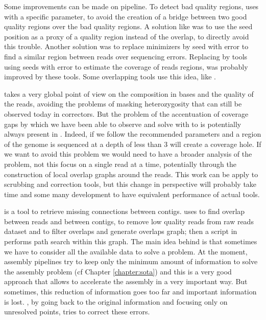 \documentclass[main.tex]{subfiles}
\begin{document}
Some improvements can be made on \yacrd pipeline. To detect bad quality regions, \yacrd uses \minimap with a specific parameter, to avoid the creation of a bridge between two good quality regions over the bad quality regions. A solution like \miniscrub was to use the seed position as a proxy of a quality region instead of the overlap, to directly avoid this trouble. Another solution was to replace minimizers by seed with error to find a similar region between reads over sequencing errors. Replacing \minimap by tools using seeds with error to estimate the coverage of reads regions, was probably improved by these tools. Some overlapping tools use this idea, like \cite{GroupK}.

\yacrd takes a very global point of view on the composition in bases and the quality of the reads, avoiding the problems of masking heterozygosity that can still be observed today in correctors. But the problem of the accentuation of coverage gaps by which we have been able to observe and solve with to \knot is potentially always present in \yacrd. Indeed, if we follow the recommended parameters and a region of the genome is sequenced at a depth of less than 3 \yacrd will create a coverage hole. If we want to avoid this problem we would need to have a broader analysis of the problem, not this focus on a single read at a time, potentially through the construction of local overlap graphs around the reads. This work can be apply to scrubbing and correction tools, but this change in perspective will probably take time and some many development to have equivalent performance of actual tools.

\knot is a tool to retrieve missing connections between contigs. \knot uses \minimap to find overlap between reads and between contigs, \yacrd to remove low quality reads from raw reads dataset and \fpa to filter overlaps and generate overlaps graph; then a script in \knot performs path search within this graph. The main idea behind \knot is that sometimes we have to consider all the available data to solve a problem. At the moment, assembly pipelines try to keep only the minimum amount of information to solve the assembly problem (cf Chapter \ref{chapter:sota}) and this is a very good approach that allows to accelerate the assembly in a very important way. But sometimes, this reduction of information goes too far and important information is lost. \knot, by going back to the original information and focusing only on unresolved points, tries to correct these errors.
\end{document}
